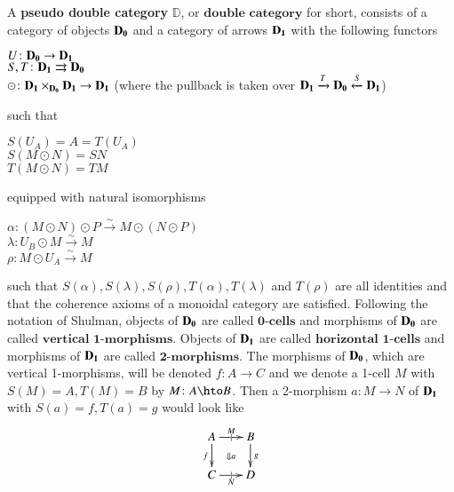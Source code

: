 \documentclass[oneside]{amsart}
\newcommand{\lD}{\ensuremath{\mathbb{D}}}
\theoremstyle{definition}
\theoremstyle{remark}
\numberwithin{equation}{section}
\begin{document}
\begin{defn}
A \textbf{pseudo double category} $\lD$, or $\textbf{double category}$ for short, consists of a category of objects $\bold{D_{0}}$ and a category of arrows $\bold{D_{1}}$ with the following functors
\begin{center}
$U\colon \bold{D_{0}} \to \bold{D_{1}}$\\
$S,T \colon \bold{D_{1}} \rightrightarrows \bold{D_{0}}$\\
$\odot \colon \bold{D_{1}} \times_{\bold{D_{0}}} \bold{D_{1}} \to \bold{D_{1}}$ (where the pullback is taken over $\bold{D_{1}} \xrightarrow[]{T} \bold{D_{0}} \xleftarrow[]{S} \bold{D_{1}}$) \\
\end{center}
 such that \\
\begin{center}
$S(U_{A})=A=T(U_{A})$\\
$S(M \odot N)=SN$\\
$T(M \odot N)=TM$\\
\end{center}
equipped with natural isomorphisms
\begin{center}

$\alpha \colon (M \odot N) \odot P \xrightarrow{\sim} M \odot (N \odot P)$\\
$\lambda \colon U_{B} \odot M \xrightarrow{\sim} M$\\
$\rho \colon M \odot U_{A} \xrightarrow{\sim} M$

\end{center}
such that $S(\alpha), S(\lambda), S(\rho), T(\alpha), T(\lambda)$ and $T(\rho)$ are all identities and that the coherence axioms of a monoidal category are satisfied. Following the notation of Shulman, objects of $\bold{D_{0}}$ are called $\textbf{0-cells}$ and morphisms of $\bold{D_{0}}$ are called $\textbf{vertical 1-morphisms}$. Objects of $\bold{D_{1}}$ are called $\textbf{horizontal 1-cells}$ and morphisms of $\bold{D_{1}}$ are called $\textbf{2-morphisms}$. The morphisms of $\bold{D_{0}}$, which are vertical 1-morphisms, will be denoted $f \colon A \to C$ and we denote a 1-cell $M$ with $S(M)=A,T(M)=B$ by $M \colon A \hto B$. Then a 2-morphism $a \colon M \to N$ of $\bold{D_{1}}$ with $S(a)=f,T(a)=g$ would look like
\begin{equation}\label{eq:square}
  \xymatrix@-.5pc{
    A \ar[r]|{|}^{M}  \ar[d]_f \ar@{}[dr]|{\Downarrow a}&
    B\ar[d]^g\\
    C \ar[r]|{|}_N & D
  }
\end{equation}
\end{defn}
\end{document}
